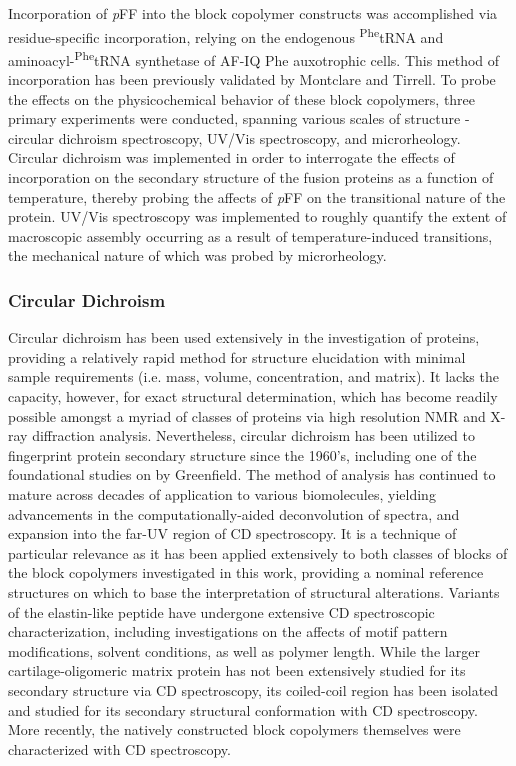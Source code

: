 \begin{refsection}
Incorporation of \emph{p}FF into the block copolymer constructs was accomplished
via residue-specific incorporation, relying on the endogenous
\textsuperscript{Phe}tRNA and aminoacyl-\textsuperscript{Phe}tRNA synthetase of
AF-IQ Phe auxotrophic cells. This method of incorporation has been previously
validated by Montclare and
Tirrell.\cite{Voloshchuk2009,Panchenko2006,Baker2011,Sharma2000,Yoshikawa1994}
To probe the effects on the physicochemical behavior of these block copolymers,
three primary experiments were conducted, spanning various scales of structure -
circular dichroism spectroscopy, UV/Vis spectroscopy, and microrheology.
Circular dichroism was implemented in order to interrogate the effects of
incorporation on the secondary structure of the fusion proteins as a function of
temperature, thereby probing the affects of \emph{p}FF on the transitional
nature of the protein. UV/Vis spectroscopy was implemented to roughly quantify
the extent of macroscopic assembly occurring as a result of temperature-induced
transitions, the mechanical nature of which was probed by microrheology. 

\subsubsection{Circular Dichroism} Circular dichroism has been used extensively
in the investigation of proteins, providing a relatively rapid method for
structure elucidation with minimal sample requirements (i.e. mass, volume,
concentration, and matrix). It lacks the capacity, however, for exact structural
determination, which has become readily possible amongst a myriad of classes of
proteins via high resolution NMR and X-ray diffraction analysis.\cite{Adler1973}
Nevertheless, circular dichroism has been utilized to fingerprint protein
secondary structure since the 1960's, including one of the foundational studies
on  by Greenfield.\cite{Greenfield1969} The method
of analysis has continued to mature across decades of application to various
biomolecules, yielding advancements in the computationally-aided deconvolution
of
spectra,\cite{Andrade1993,Sreerama1993,Manavalan1987,Provencher1981,Johnson1999}
and expansion into the far-UV region of CD
spectroscopy.\cite{Brahms1980,Wallace2009,Miles2006} It is a technique of
particular relevance as it has been applied extensively to both classes of
blocks of the block copolymers investigated in this work, providing a nominal
reference structures on which to base the interpretation of structural
alterations. Variants of the elastin-like peptide have undergone extensive CD
spectroscopic characterization, including investigations on the affects of motif
pattern modifications,\cite{Nuhn2008,Kim2005} solvent conditions,\cite{URRY1974}
as well as polymer length.\cite{Nuhn2008,Urry1986,Reiersen1998} While the larger
cartilage-oligomeric matrix protein has not been extensively studied for its
secondary structure via CD spectroscopy, its coiled-coil region has been
isolated and studied for its secondary structural conformation with CD
spectroscopy.\cite{Gunasekar2009,Terskikh1997} More recently, the natively
constructed block copolymers themselves were characterized with CD
spectroscopy.\cite{Haghpanah2009}


\end{refsection}
